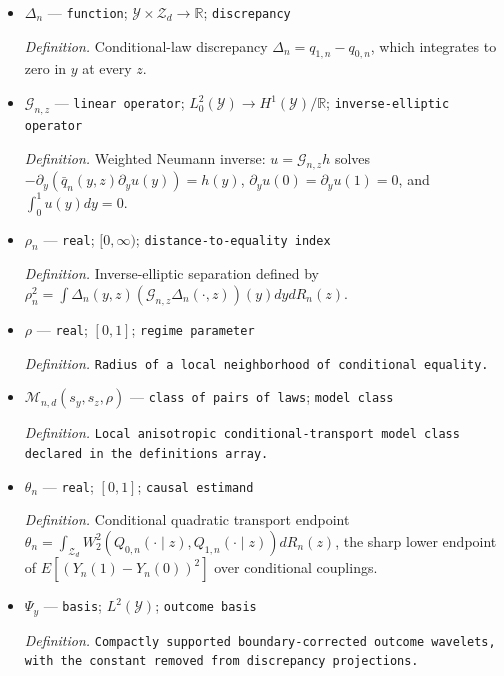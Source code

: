 \documentclass{article}
\begin{document}
\begin{itemize}
  \par\smallskip\noindent\emph{Definition.} Reference density \(\bar q_n=(q_{0,n}+q_{1,n})/2\).
  \item \(\Delta_n\) --- \texttt{function}; \(\mathcal Y\times\mathcal Z_d\to\mathbb R\); \texttt{discrepancy}
  \par\smallskip\noindent\emph{Definition.} Conditional-law discrepancy \(\Delta_n=q_{1,n}-q_{0,n}\), which integrates to zero in \(y\) at every \(z\).
  \item \(\mathcal G_{n,z}\) --- \texttt{linear operator}; \(L_0^2(\mathcal Y)\to H^1(\mathcal Y)/\mathbb R\); \texttt{inverse-\allowbreak{}elliptic operator}
  \par\smallskip\noindent\emph{Definition.} Weighted Neumann inverse: \(u=\mathcal G_{n,z}h\) solves \(-\partial_y(\bar q_n(y,z)\partial_yu(y))=h(y)\), \(\partial_yu(0)=\partial_yu(1)=0\), and \(\int_0^1u(y)dy=0\).
  \item \(\rho_n\) --- \texttt{real}; \([0,\infty)\); \texttt{distance-\allowbreak{}to-\allowbreak{}equality index}
  \par\smallskip\noindent\emph{Definition.} Inverse-elliptic separation defined by \(\rho_n^2=\int\Delta_n(y,z)(\mathcal G_{n,z}\Delta_n(\cdot,z))(y)dydR_n(z)\).
  \item \(\rho\) --- \texttt{real}; \([0,1]\); \texttt{regime parameter}
  \par\smallskip\noindent\emph{Definition.} \texttt{Radius of a local neighborhood of conditional equality.}
  \item \(\mathcal M_{n,d}(s_y,s_z,\rho)\) --- \texttt{class of pairs of laws}; \texttt{model class}
  \par\smallskip\noindent\emph{Definition.} \texttt{Local anisotropic conditional-\allowbreak{}transport model class declared in the definitions array.}
  \item \(\theta_n\) --- \texttt{real}; \([0,1]\); \texttt{causal estimand}
  \par\smallskip\noindent\emph{Definition.} Conditional quadratic transport endpoint \(\theta_n=\int_{\mathcal Z_d}W_2^2(Q_{0,n}(\cdot\mid z),Q_{1,n}(\cdot\mid z))dR_n(z)\), the sharp lower endpoint of \(E[(Y_n(1)-Y_n(0))^2]\) over conditional couplings.
  \item \(\Psi_y\) --- \texttt{basis}; \(L^2(\mathcal Y)\); \texttt{outcome basis}
  \par\smallskip\noindent\emph{Definition.} \texttt{Compactly supported boundary-\allowbreak{}corrected outcome wavelets,\allowbreak{} with the constant removed from discrepancy projections.}

\end{itemize}
\end{document}
